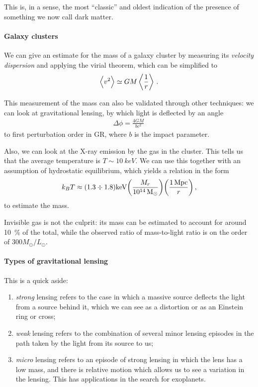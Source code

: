 \documentclass[main.tex]{subfiles}
\begin{document}
This is, in a sense, the most ``classic'' and oldest indication of the presence
of something we now call dark matter. 

\paragraph{Galaxy clusters}

We can give an estimate for the mass of a galaxy cluster by measuring its
\emph{velocity dispersion} and applying the virial theorem, which can be simplified to 
%
\begin{align}
\expval{v^2} \simeq GM \expval{ \frac{1}{r}}
\,.
\end{align}

This measurement of the mass can also be validated through other techniques: 
we can look at gravitational lensing, by which light is deflected by an angle 
%
\begin{align}
\Delta \phi = \frac{4GM}{bc^2}
\,
\end{align}
%
to first perturbation order in GR, where \(b\) is the impact parameter. 

Also, we can look at the X-ray emission by the gas in the cluster. 
This tells us that the average temperature is \(T \sim \SI{10}{keV}\). 
We can use this together with an assumption of hydrostatic equilibrium, which yields a relation in the form 
%
\begin{align}
k_B T \approx (1.3 \divisionsymbol 1.8)\SI{}{keV}
\qty(\frac{M_r}{\SI{e14}{M_{\odot}}}) 
\qty(\frac{\SI{1}{Mpc}}{r})
\,,
\end{align}
%
to estimate the mass. 


Invisible gas is not the culprit: its mass can be estimated to account for around 
\SI{10}{\percent} of the total, while the observed ratio of mass-to-light ratio is on the order of \(300 M_{\odot} / L_{\odot}\).

\paragraph{Types of gravitational lensing}

This is a quick aside: 
\begin{enumerate}
    \item \emph{strong} lensing refers to the case in which a massive source 
    deflects the light from a source behind it, which we can see as a distortion or as an 
    Einstein ring or cross;
    \item \emph{weak} lensing refers to the combination of several minor lensing episodes
    in the path taken by the light from its source to us;
    \item \emph{micro} lensing refers to an episode of strong lensing in which the lens
    has a low mass, and there is relative motion which allows us to see a variation
    in the lensing. 
    This has applications in the search for exoplanets. 
\end{enumerate}
\end{document}
